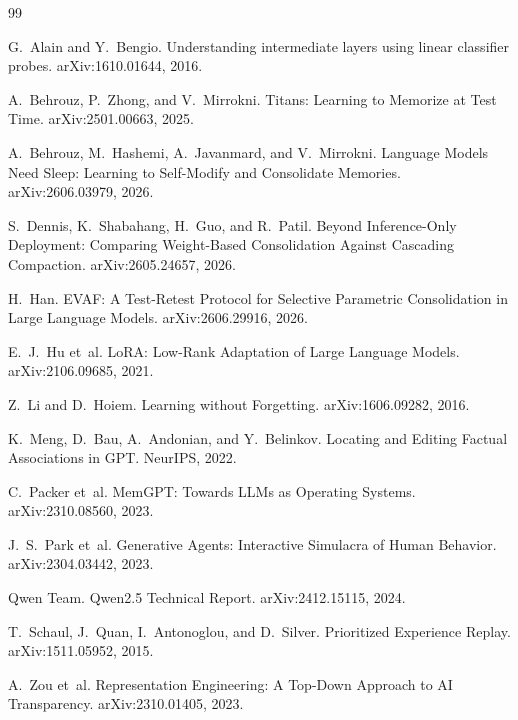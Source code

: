 \documentclass[11pt,a4paper]{article}
\begin{document}
\begin{thebibliography}{99}

G.~Alain and Y.~Bengio.
\newblock Understanding intermediate layers using linear classifier probes.
\newblock arXiv:1610.01644, 2016.

A.~Behrouz, P.~Zhong, and V.~Mirrokni.
\newblock Titans: Learning to Memorize at Test Time.
\newblock arXiv:2501.00663, 2025.

A.~Behrouz, M.~Hashemi, A.~Javanmard, and V.~Mirrokni.
\newblock Language Models Need Sleep: Learning to Self-Modify and Consolidate Memories.
\newblock arXiv:2606.03979, 2026.

S.~Dennis, K.~Shabahang, H.~Guo, and R.~Patil.
\newblock Beyond Inference-Only Deployment: Comparing Weight-Based Consolidation Against Cascading Compaction.
\newblock arXiv:2605.24657, 2026.

H.~Han.
\newblock EVAF: A Test-Retest Protocol for Selective Parametric Consolidation in Large Language Models.
\newblock arXiv:2606.29916, 2026.

E.~J.~Hu et~al.
\newblock LoRA: Low-Rank Adaptation of Large Language Models.
\newblock arXiv:2106.09685, 2021.

Z.~Li and D.~Hoiem.
\newblock Learning without Forgetting.
\newblock arXiv:1606.09282, 2016.

K.~Meng, D.~Bau, A.~Andonian, and Y.~Belinkov.
\newblock Locating and Editing Factual Associations in GPT.
\newblock NeurIPS, 2022.

C.~Packer et~al.
\newblock MemGPT: Towards LLMs as Operating Systems.
\newblock arXiv:2310.08560, 2023.

J.~S.~Park et~al.
\newblock Generative Agents: Interactive Simulacra of Human Behavior.
\newblock arXiv:2304.03442, 2023.

Qwen Team.
\newblock Qwen2.5 Technical Report.
\newblock arXiv:2412.15115, 2024.

T.~Schaul, J.~Quan, I.~Antonoglou, and D.~Silver.
\newblock Prioritized Experience Replay.
\newblock arXiv:1511.05952, 2015.

A.~Zou et~al.
\newblock Representation Engineering: A Top-Down Approach to AI Transparency.
\newblock arXiv:2310.01405, 2023.

\end{thebibliography}
\end{document}
